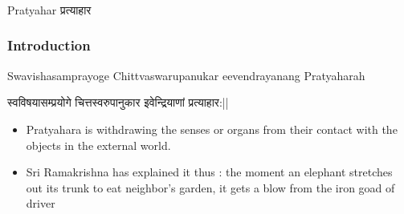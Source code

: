 \begin{frame}[fragile]\frametitle{}
\begin{center}
{\Large Pratyahar प्रत्याहार}
\end{center}
\end{frame}

\begin{frame}[fragile]\frametitle{Introduction}

Swavishasamprayoge Chittvaswarupanukar eevendrayanang Pratyaharah

स्वविषयासम्प्रयोगे चित्तस्वरुपानुकार इवेन्द्रियाणां प्रत्याहार:||

	\begin{itemize}
	\item Pratyahara  is  withdrawing 
the  senses  or  organs  from 
their  contact  with  the 
objects  in  the  external 
world.  
	\item Sri  Ramakrishna  has 
explained  it  thus  :  the 
moment  an  elephant 
stretches out its trunk to eat 
neighbor’s  garden,  it  gets  a 
blow  from  the  iron  goad  of 
driver 
	\end{itemize}

\end{frame}


